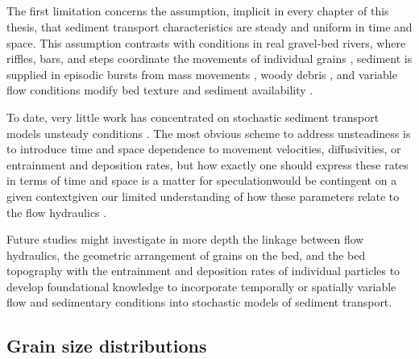 \subsection{\DIFdelbegin {}\DIFdelend \DIFaddbegin {}\DIFaddend }

The first limitation concerns the assumption, implicit in every chapter of this thesis, that sediment transport characteristics are steady and uniform in time and space.
This assumption contrasts with conditions in real gravel-bed rivers, where riffles, bars, and steps coordinate the movements of individual grains \citep{Ashmore1998,McDowell2020}, sediment is supplied in episodic bursts from mass movements \citep{Benda1990, Muller2018}, woody debris \DIFdelbegin {}\DIFdelend \DIFaddbegin {}\DIFaddend \citep{Eaton2012,Reid2019}, and variable flow conditions modify bed texture and sediment availability \citep{Mao2012,Phillips2018}.

To date, very little work has concentrated on \DIFaddbegin {}\DIFaddend stochastic sediment transport models \DIFdelbegin {}\DIFdelend \DIFaddbegin {}\DIFaddend unsteady conditions \citep[e.g.][]{Bohorquez2016}.
The most obvious scheme to address unsteadiness is to introduce time and space dependence to movement velocities, diffusivities, or entrainment and deposition rates, but how exactly one should express these rates in terms of time and space is a matter for speculation\DIFdelbegin {}\DIFdelend \DIFaddbegin {}\DIFaddend would be contingent on a given context\DIFaddbegin \DIFadd{, }\DIFaddend given our limited understanding of how these parameters relate to the flow hydraulics \DIFaddbegin {}\DIFaddend \citep[e.g.][]{Heyman2016}.

Future studies might investigate in more depth the linkage between flow hydraulics, the geometric arrangement of grains on the bed, and the bed topography with the entrainment and deposition rates of individual particles to develop \DIFdelbegin {}\DIFdelend \DIFaddbegin {}\DIFaddend foundational knowledge to \DIFaddbegin {}\DIFaddend incorporate temporally or spatially variable flow and sedimentary conditions into stochastic models of sediment transport.

\subsection{Grain size distributions}

